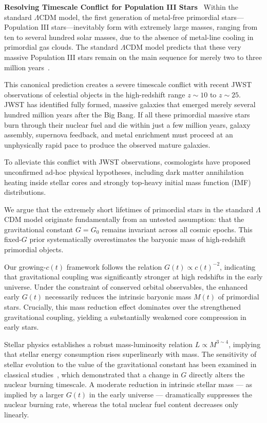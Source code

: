 \documentclass[12pt,leqno]{article}
\begin{document}
{	
	
	
	
	\medskip
	\bigskip
	\textbf{Resolving Timescale Conflict for Population III Stars}\,\,\,
	Within the standard $\Lambda$CDM model, the first generation of metal-free primordial stars---Population III stars---inevitably form with extremely large masses, ranging from ten to several hundred solar masses, due to the absence of metal-line cooling in primordial gas clouds. The standard $\Lambda$CDM model predicts that these very massive Population III stars remain on the main sequence for merely two to three million years~\cite{Topping:2023}.
	
	\medskip
	This canonical prediction creates a severe timescale conflict with recent JWST observations of celestial objects in the high-redshift range $z\sim10$ to $z\sim25$. JWST has identified fully formed, massive galaxies that emerged merely several hundred million years after the Big Bang. If all these primordial massive stars burn through their nuclear fuel and die within just a few million years, galaxy assembly, supernova feedback, and metal enrichment must proceed at an unphysically rapid pace to produce the observed mature galaxies.
	
	\medskip
	To alleviate this conflict with JWST observations, cosmologists have proposed unconfirmed ad-hoc physical hypotheses, including dark matter annihilation heating inside stellar cores and strongly top-heavy initial mass function (IMF) distributions.
	
	\medskip
	We argue that the extremely short lifetimes of primordial stars in the standard $\Lambda$CDM model originate fundamentally from an untested assumption: that the gravitational constant $G=G_0$ remains invariant across all cosmic epochs. This fixed-$G$ prior systematically overestimates the baryonic mass of high-redshift primordial objects.
	
	\medskip
	Our growing-$c(t)$ framework follows the relation $G(t)\propto c(t)^{-2}$, indicating that gravitational coupling was significantly stronger at high redshifts in the early universe. Under the constraint of conserved orbital observables, the enhanced early $G(t)$ necessarily reduces the intrinsic baryonic mass $M(t)$ of primordial stars. Crucially, this mass reduction effect dominates over the strengthened gravitational coupling, yielding a substantially weakened core compression in early stars.
	
	\medskip
	Stellar physics establishes a robust mass-luminosity relation $L\propto M^{3\sim4}$, implying that stellar energy consumption rises superlinearly with mass. The sensitivity of stellar evolution to the value of the gravitational constant has been examined in classical studies~\cite{Prather:1976}, which demonstrated that a change in \(G\) directly alters the nuclear burning timescale. A moderate reduction in intrinsic stellar mass — as implied by a larger \(G(t)\) in the early universe — dramatically suppresses the nuclear burning rate, whereas the total nuclear fuel content decreases only linearly.
	
}
\end{document}
